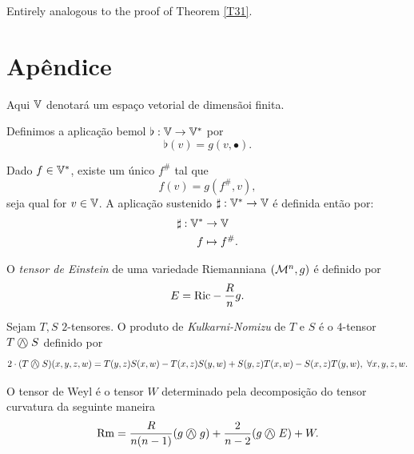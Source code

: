 \begin{demm}
	Entirely analogous to the proof of Theorem \cref{T31}.
\end{demm}











      \section{Apêndice}

\begin{oobs}
Aqui $\mathbb{V}$ denotará um espaço vetorial de dimensãoi finita.
\end{oobs}

\begin{deff}\label{DefinicaoDoBemol}
  Definimos a aplicação bemol $\flat: \mathbb{V} \to \mathbb{V}^{\ast}$ por $$\flat(v) = g(v, \bullet).$$
  \end{deff} 
\begin{deff}
  Dado $f \in \mathbb{V}^{\ast}$, existe um único $f^{\#}$ tal que $$f(v) = g\left(f^{\#}, v\right),$$ seja qual for $v \in \mathbb{V}$. A aplicação sustenido $\sharp: \mathbb{V}^{\ast} \to \mathbb{V}$ é definida então por:
  \begin{align*}
  \sharp: \mathbb{V}^{\ast} &\to \mathbb{V} \\
  f &\mapsto f^{\#}.
  \end{align*}
  \end{deff}
  
\begin{deff}
  O \textit{tensor de Einstein} de uma variedade Riemanniana $\left(\mathcal{M}^n, g \right)$ é definido por
  $$E= \mathrm{Ric} - \frac{R}{n} g.$$
  \end{deff}

\begin{deff}\label{DefKulNomizu}
  Sejam $T, S$ $2$-tensores. O produto de \textit{Kulkarni-Nomizu} de $T$ e $S$ é o $4$-tensor $T \mathbin{\bigcirc\mspace{-15mu}\wedge\mspace{4mu}} S$ definido por
  $$2 \cdot (T \mathbin{\bigcirc\mspace{-15mu}\wedge\mspace{4mu}} S)(x, y, z, w) = T(y, z) S(x, w) - T(x, z) S(y, w)  + S(y, z) T(x, w) - S(x, z) T(y, w), \ \forall x,y, z, w.$$
  \end{deff}

  \begin{deff}
  O tensor de Weyl é o tensor $W$ determinado pela decomposição do tensor curvatura da seguinte maneira
  $$\mathrm{Rm} = \frac{R}{n(n-1)} (g \mathbin{\bigcirc\mspace{-15mu}\wedge\mspace{4mu}} g) + \frac{2}{n-2} (g \mathbin{\bigcirc\mspace{-15mu}\wedge\mspace{4mu}} E) + W.$$ 
  \end{deff}

